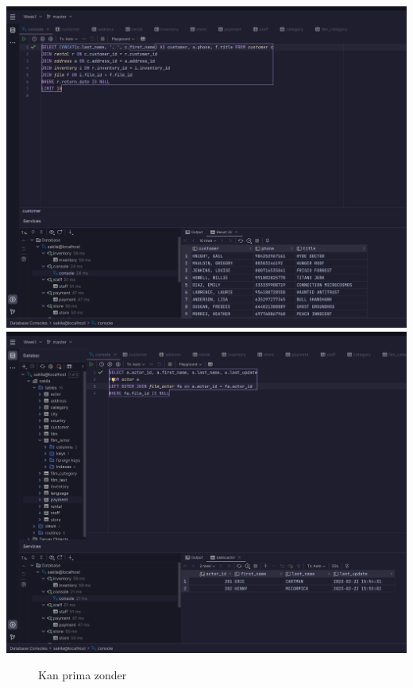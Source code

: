 \documentclass{exam}
\begin{document}
\begin{questions}
	\includegraphics[width=\textwidth,height=\textheight,keepaspectratio]{question7}
	\question
	\includegraphics[width=\textwidth,height=\textheight,keepaspectratio]{question8}
	\begin{figure}
		\question
		\caption{Kan prima zonder}
		\centering

\end{figure}
\end{questions}
\end{document}
